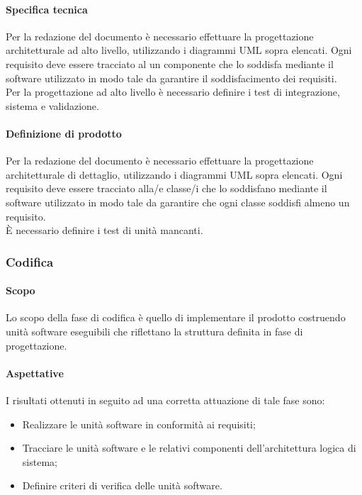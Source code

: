 \documentclass[../NormeDiProgetto.tex]{subfiles}
\begin{document}
			\paragraph{Specifica tecnica\\}
				Per la redazione del documento è necessario effettuare la progettazione architetturale ad
				alto livello, utilizzando i diagrammi UML sopra elencati. Ogni requisito deve essere tracciato
				al un componente che lo soddisfa mediante il software utilizzato in modo tale da garantire
				il soddisfacimento dei requisiti.\\
				Per la progettazione ad alto livello è necessario definire i test di integrazione, sistema e
				validazione.
			\paragraph{Definizione di prodotto\\}
				Per la redazione del documento è necessario effettuare la progettazione architetturale di
				dettaglio, utilizzando i diagrammi UML sopra elencati. Ogni requisito deve essere tracciato
				alla/e classe/i che lo soddisfano mediante il software utilizzato in modo tale da garantire
				che ogni classe soddisfi almeno un requisito.\\
				È necessario definire i test di unità mancanti.
		\subsubsection{Codifica}
			\paragraph{Scopo\\}
				Lo scopo della fase di codifica è quello di implementare il prodotto costruendo
				unità software eseguibili che riflettano la struttura definita in fase di
				progettazione.
			\paragraph{Aspettative\\}
				I risultati ottenuti in seguito ad una corretta attuazione di tale fase sono:
				\begin{itemize}
					\item Realizzare le unità software in conformità ai requisiti;
					\item Tracciare le unità software e le relativi componenti dell'architettura
					logica di sistema;
					\item Definire criteri di verifica delle unità software.
				\end{itemize}
\end{document}
